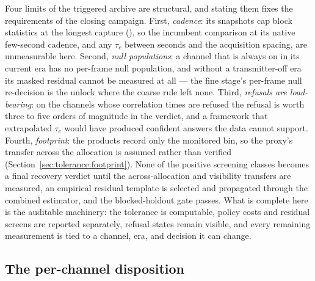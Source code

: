 Four limits of the triggered archive are structural, and stating them fixes the requirements of the closing campaign. First, \emph{cadence}: its snapshots cap block statistics at the longest capture (), so the incumbent comparison at its native few-second cadence, and any $\tau_c$ between seconds and the acquisition spacing, are unmeasurable here. Second, \emph{null populations}: a channel that is always on in its current era has no per-frame null population, and without a transmitter-off era its masked residual cannot be measured at all --- the fine stage's per-frame null re-decision is the unlock where the coarse rule left none. Third, \emph{refusals are load-bearing}: on the channels whose correlation times are refused the refusal is worth three to five orders of magnitude in the verdict, and a framework that extrapolated $\tau_c$ would have produced confident answers the data cannot support. Fourth, \emph{footprint}: the products record only the monitored bin, so the proxy's transfer across the allocation is assumed rather than verified (Section~\ref{sec:tolerance:footprint}). None of the positive screening classes becomes a final recovery verdict until the across-allocation and visibility transfers are measured, an empirical residual template is selected and propagated through the combined estimator, and the blocked-holdout gate passes. What is complete here is the auditable machinery: the tolerance is computable, policy costs and residual screens are reported separately, refusal states remain visible, and every remaining measurement is tied to a channel, era, and decision it can change.

\subsection*{The per-channel disposition}

